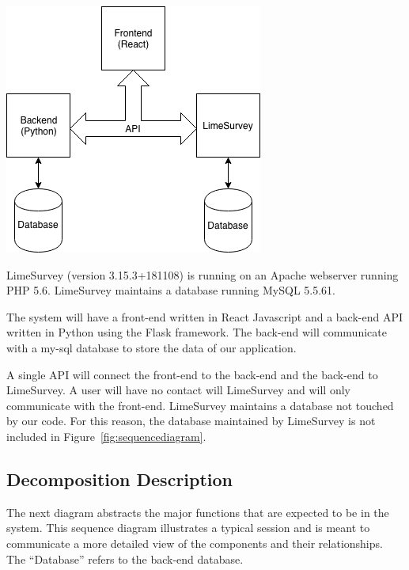 \documentclass{article}
\begin{document}
\begin{center}
\label{fig:componentdiagram}
{\includegraphics[scale=.7]{images/component_diagram.png}} 
\end{center}

LimeSurvey (version 3.15.3+181108) is running on an Apache webserver running PHP 5.6. LimeSurvey maintains a database running MySQL 5.5.61. 

The system will have a front-end written in React Javascript and a back-end API written in Python using the Flask framework. The back-end will communicate with a my-sql database to store the data of our application. 

A single API will connect the front-end to the back-end and the back-end to LimeSurvey. A user will have no contact will LimeSurvey and will only communicate with the front-end. LimeSurvey maintains a database not touched by our code. For this reason, the database maintained by LimeSurvey is not included in Figure~\ref{fig:sequencediagram}. 

\subsection{Decomposition Description}

The next diagram abstracts the major functions that are expected to be in the system. This sequence diagram illustrates a typical session and is meant to communicate a more detailed view of the components and their relationships. The ``Database'' refers to the back-end database.
\end{document}
